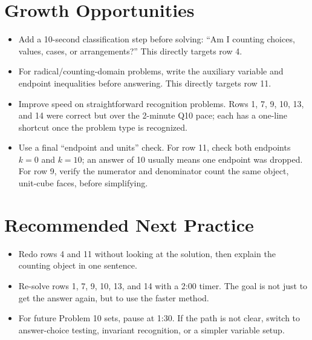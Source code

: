 \documentclass[11pt]{article}
\begin{document}
\section{Growth Opportunities}

\begin{itemize}
  \item Add a 10-second classification step before solving: ``Am I counting choices, values, cases, or arrangements?'' This directly targets row 4.
  \item For radical/counting-domain problems, write the auxiliary variable and endpoint inequalities before answering. This directly targets row 11.
  \item Improve speed on straightforward recognition problems. Rows 1, 7, 9, 10, 13, and 14 were correct but over the 2-minute Q10 pace; each has a one-line shortcut once the problem type is recognized.
  \item Use a final ``endpoint and units'' check. For row 11, check both endpoints \(k=0\) and \(k=10\); an answer of 10 usually means one endpoint was dropped. For row 9, verify the numerator and denominator count the same object, unit-cube faces, before simplifying.
\end{itemize}

\section{Recommended Next Practice}

\begin{itemize}
  \item Redo rows 4 and 11 without looking at the solution, then explain the counting object in one sentence.
  \item Re-solve rows 1, 7, 9, 10, 13, and 14 with a 2:00 timer. The goal is not just to get the answer again, but to use the faster method.
  \item For future Problem 10 sets, pause at 1:30. If the path is not clear, switch to answer-choice testing, invariant recognition, or a simpler variable setup.
\end{itemize}
\end{document}
